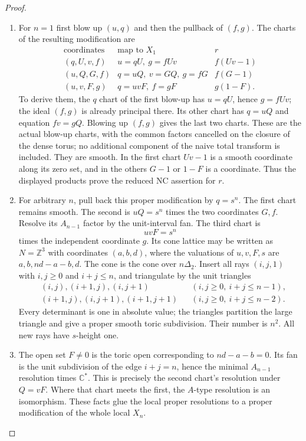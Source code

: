 \begin{proof}
\begin{enumerate}[label=\arabic*.,leftmargin=*]
\item For $n=1$ first blow up $(u,q)$ and then the pullback
of $(f,g)$. The charts of the resulting modification are
\[
\begin{array}{c|c|c}
 \text{coordinates}&\text{map to }X_1&r\\\hline
 (q,U,v,f)&u=qU,\ g=fUv&f(Uv-1)\\
 (u,Q,G,f)&q=uQ,\ v=GQ,\ g=fG&f(G-1)\\
 (u,v,F,g)&q=uvF,\ f=gF&g(1-F).
\end{array}
\]
To derive them, the $q$ chart of the first blow-up
has $u=qU$, hence $g=fUv$; the ideal $(f,g)$ is
already principal there. Its other chart has
$q=uQ$ and equation $fv=gQ$. Blowing up $(f,g)$
gives the last two charts. These are the actual
blow-up charts, with the common factors cancelled
on the closure of the dense torus; no additional
component of the naive total transform is included.
They are smooth. In the first chart $Uv-1$ is a
smooth coordinate along its zero set, and in the
others $G-1$ or $1-F$ is a coordinate. Thus the
displayed products prove the reduced NC assertion
for $r$.

\item For arbitrary $n$, pull back this proper modification
by $q=s^n$. The first chart remains smooth. The
second is $uQ=s^n$ times the two coordinates $G,f$.
Resolve its $A_{n-1}$ factor by the unit-interval fan.
The third chart is
\[
 uvF=s^n
\]
times the independent coordinate $g$. Its cone lattice
may be written as $N=\mathbb Z^3$ with coordinates
$(a,b,d)$, where the valuations of $u,v,F,s$ are
$a,b,nd-a-b,d$. The cone is the cone over
$n\Delta_2$. Insert all rays $(i,j,1)$ with
$i,j\ge0$ and $i+j\le n$, and triangulate by the
unit triangles
\[
\begin{aligned}
 &(i,j),(i+1,j),(i,j+1) &&(i,j\ge0,\ i+j\le n-1),\\
 &(i+1,j),(i,j+1),(i+1,j+1)
                       &&(i,j\ge0,\ i+j\le n-2).
\end{aligned}
\]
Every determinant is one in absolute value; the
triangles partition the large triangle and give a
proper smooth toric subdivision. Their number is
$n^2$. All new rays have $s$-height one.

\item The open set $F\ne0$ is the toric open corresponding
to $nd-a-b=0$. Its fan is the unit subdivision of
the edge $i+j=n$, hence the minimal $A_{n-1}$
resolution times $\mathbb C^*$. This is precisely
the second chart's resolution under $Q=vF$.
Where that chart meets the first, the $A$-type
resolution is an isomorphism. These facts glue
the local proper resolutions to a proper
modification of the whole local $X_n$.


\end{enumerate}
\end{proof}
